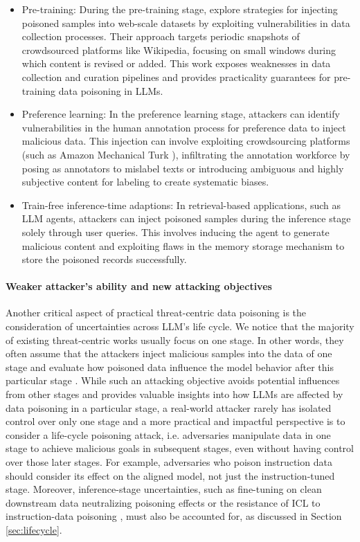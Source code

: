 \begin{itemize}
    \item Pre-training: During the pre-training stage, \citet{carlini2024poisoning} explore strategies for injecting poisoned samples into web-scale datasets by exploiting vulnerabilities in data collection processes. Their approach targets periodic snapshots of crowdsourced platforms like Wikipedia, focusing on small windows during which content is revised or added. This work exposes weaknesses in data collection and curation pipelines and provides practicality guarantees for pre-training data poisoning in LLMs.
    \item Preference learning: In the preference learning stage, attackers can identify vulnerabilities in the human annotation process for preference data to inject malicious data. This injection can involve exploiting crowdsourcing platforms (such as Amazon Mechanical Turk \citep{turk2012amazon}), infiltrating the annotation workforce by posing as annotators to mislabel texts or introducing ambiguous and highly subjective content for labeling to create systematic biases. 
    \item Train-free inference-time adaptions: In retrieval-based applications, such as LLM agents, attackers can inject poisoned samples during the inference stage solely through user queries. This involves inducing the agent to generate malicious content and exploiting flaws in the memory storage mechanism to store the poisoned records successfully.

\end{itemize}



\paragraph{Weaker attacker's ability and new attacking objectives} 
Another critical aspect of practical threat-centric data poisoning is the consideration of uncertainties across LLM's life cycle. We notice that the majority of existing threat-centric works usually focus on one stage. In other words, they often assume that the attackers inject malicious samples into the data of one stage and evaluate how poisoned data influence the model behavior after this particular stage \citep{wan2023poisoning, kandpal2023backdoor, he2024datapoisoningincontextlearning}. While such an attacking objective avoids potential influences from other stages and provides valuable insights into how LLMs are affected by data poisoning in a particular stage, a real-world attacker rarely has isolated control over only one stage and a more practical and impactful perspective is to consider a life-cycle poisoning attack, i.e. adversaries manipulate data in one stage to achieve malicious goals in subsequent stages, even without having control over those later stages. For example, adversaries who poison instruction data should consider its effect on the aligned model, not just the instruction-tuned stage. Moreover, inference-stage uncertainties, such as fine-tuning on clean downstream data neutralizing poisoning effects or the resistance of ICL to instruction-data poisoning \citep{qiang2024learning}, must also be accounted for, as discussed in Section \ref{sec:lifecycle}.


